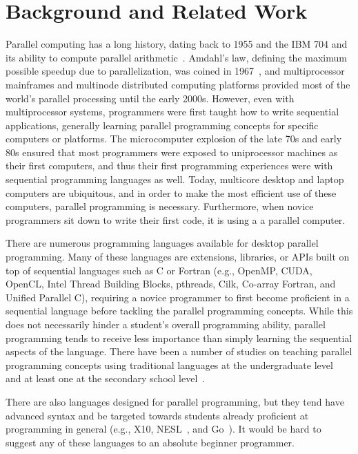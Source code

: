 \documentclass{sig-alternate}
\begin{document}
\section{Background and Related Work}

Parallel computing has a long history, dating back to 1955 and the IBM 704
and its ability to compute parallel arithmetic~\cite{hockney1988parallel}.  Amdahl's law,
defining the maximum possible speedup due to parallelization, was coined in 
1967~\cite{amdahl1967validity}, and multiprocessor mainframes and multinode distributed
computing platforms provided most of the world's parallel processing until the early 2000s.
However, even with multiprocessor systems, programmers were first taught how to write
sequential applications, generally learning parallel programming concepts for specific
computers or platforms.  The microcomputer explosion of the late 70s and early 80s
ensured that most programmers were exposed to uniprocessor machines as their first computers,
and thus their first programming experiences were with sequential programming languages as well.
Today, multicore desktop and laptop computers are ubiquitous, and in order to make the most
efficient use of these computers, parallel programming is necessary.  Furthermore, when novice
programmers sit down to write their first code, it is using a a parallel computer.

There are numerous programming languages available for desktop parallel programming.  Many of
these languages are extensions, libraries, or APIs built on top of sequential languages such 
as C or Fortran (e.g., OpenMP, CUDA, 
OpenCL, Intel Thread Building Blocks, pthreads, Cilk,
Co-array Fortran, and Unified Parallel C),
requiring a novice programmer to first become proficient in a sequential language before
tackling the parallel programming concepts.  While this does not necessarily hinder a student's
overall programming ability, parallel programming tends to receive less importance than simply
learning the sequential aspects of the language.  There have been a number of studies on teaching 
parallel programming concepts using traditional languages at the 
undergraduate level~\cite{freshmanParallel,undergraduateParallel,gridPortal} 
and at least one at the secondary school level~\cite{highSchoolParallel}.

There are also languages designed for parallel programming, but they tend have advanced
syntax and be targeted towards
students already proficient at programming in general (e.g., X10\cite{X10}, 
NESL~\cite{nesl-impl-94}, and Go~\cite{GoLanguage}).  It would be hard to suggest any of these
languages to an absolute beginner programmer.
\end{document}
